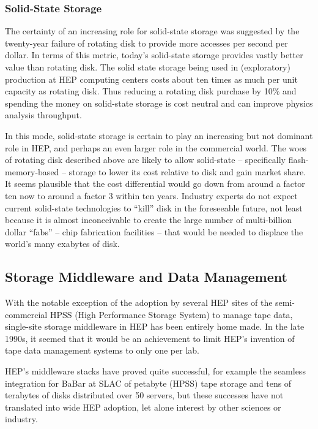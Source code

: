 \subsubsection{Solid-State Storage}
The certainty of an increasing role for solid-state storage was suggested by 
the twenty-year failure of rotating disk to provide more accesses per second 
per dollar.  In terms of this metric, today’s solid-state storage provides 
vastly better value than rotating disk.  The solid state storage being used 
in (exploratory) production at HEP computing centers costs about ten times as 
much per unit capacity as rotating disk.  Thus reducing a rotating disk purchase 
by 10\% and spending the money on solid-state storage is cost neutral and can 
improve physics analysis throughput.

In this mode, solid-state storage is certain to play an increasing but not 
dominant role in HEP, and perhaps an even larger role in the commercial world.  
The woes of rotating disk described above are likely to allow solid-state -- 
specifically flash-memory-based -- storage to lower its cost relative to disk 
and gain market share.  It seems plausible that the cost differential would 
go down from around a factor ten now to around a factor 3 within ten years.  
Industry experts do not expect current solid-state technologies to “kill” disk 
in the foreseeable future, not least because it is almost inconceivable to 
create the large number of multi-billion dollar ``fabs'' -- chip fabrication 
facilities -- that would be needed to displace the world’s many exabytes of disk.

\subsection{Storage Middleware and Data Management}
With the notable exception of the adoption by several HEP sites of the 
semi-commercial HPSS (High Performance Storage System) to manage tape data, 
single-site storage middleware in HEP has been entirely home made.  In the 
late 1990s, it seemed that it would be an achievement to limit HEP’s invention 
of tape data management systems to only one per lab.

HEP’s middleware stacks have proved quite successful, for example the seamless 
integration for BaBar at SLAC of petabyte (HPSS) tape storage and tens of terabytes 
of disks distributed over 50 servers, but these successes have not translated into 
wide HEP adoption, let alone interest by other sciences or industry. 

